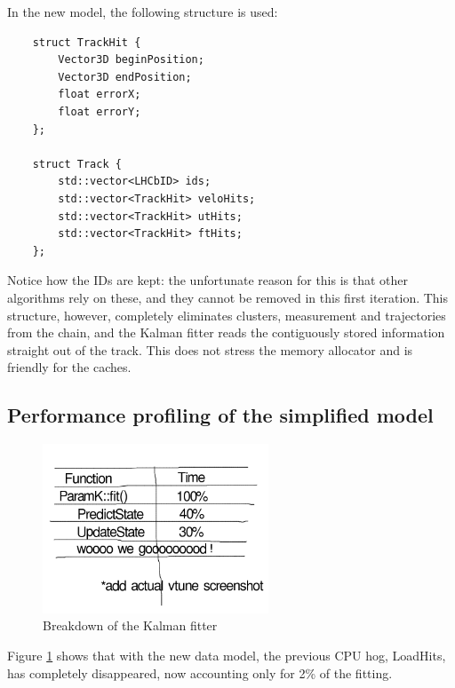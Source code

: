 \documentclass[12pt]{article}
\begin{document}
In the new model, the following structure is used:
\begin{lstlisting}
	struct TrackHit {
		Vector3D beginPosition;
		Vector3D endPosition;
		float errorX;
		float errorY;
	};
	
	struct Track {
		std::vector<LHCbID> ids;
		std::vector<TrackHit> veloHits;
		std::vector<TrackHit> utHits;
		std::vector<TrackHit> ftHits;
	};
\end{lstlisting}

Notice how the IDs are kept: the unfortunate reason for this is that other algorithms rely on these, and they cannot be removed in this first iteration. This structure, however, completely eliminates clusters, measurement and trajectories from the chain, and the Kalman fitter reads the contiguously stored information straight out of the track. This does not stress the memory allocator and is friendly for the caches.


\subsection{Performance profiling of the simplified model}


\begin{figure}[H]
	\begin{center}
		\includegraphics[width=0.6\textwidth]{kalmanfit_simplified_overall_breakdown}
	\end{center}
	\caption{Breakdown of the Kalman fitter}
	\label{fig_kalmanfit_simplified_overall_breakdown}
\end{figure}

Figure \ref{fig_kalmanfit_simplified_overall_breakdown} shows that with the new data model, the previous CPU hog, LoadHits, has completely disappeared, now accounting only for 2\% of the fitting.
\end{document}
